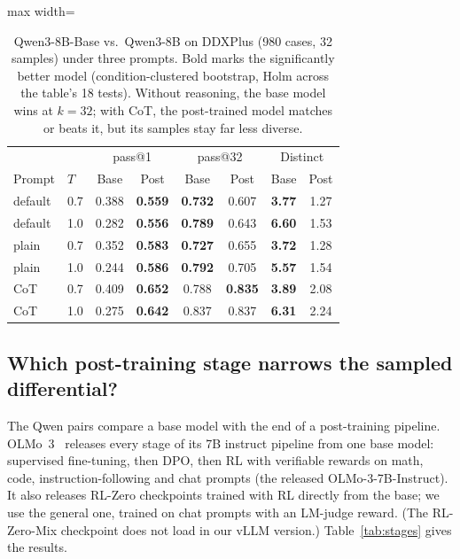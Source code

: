 \documentclass[wcp]{jmlr}
\begin{document}
\begin{table}[t]
\centering\small
\begin{adjustbox}{max width=\linewidth}
\begin{tabular}{llcccccc}
\toprule
 & & \multicolumn{2}{c}{pass@1} & \multicolumn{2}{c}{pass@32} & \multicolumn{2}{c}{Distinct} \\
Prompt & $T$ & Base & Post & Base & Post & Base & Post \\
\midrule
default & 0.7 & 0.388 & \textbf{0.559} & \textbf{0.732} & 0.607 & \textbf{3.77} & 1.27 \\
default & 1.0 & 0.282 & \textbf{0.556} & \textbf{0.789} & 0.643 & \textbf{6.60} & 1.53 \\
plain & 0.7 & 0.352 & \textbf{0.583} & \textbf{0.727} & 0.655 & \textbf{3.72} & 1.28 \\
plain & 1.0 & 0.244 & \textbf{0.586} & \textbf{0.792} & 0.705 & \textbf{5.57} & 1.54 \\
CoT & 0.7 & 0.409 & \textbf{0.652} & 0.788 & \textbf{0.835} & \textbf{3.89} & 2.08 \\
CoT & 1.0 & 0.275 & \textbf{0.642} & 0.837 & 0.837 & \textbf{6.31} & 2.24 \\
\bottomrule
\end{tabular}
\end{adjustbox}
\caption{Qwen3-8B-Base vs.\ Qwen3-8B on DDXPlus (980 cases, 32 samples) under three prompts. Bold marks the significantly better model (condition-clustered bootstrap, Holm across the table's 18 tests). Without reasoning, the base model wins at $k{=}32$; with CoT, the post-trained model matches or beats it, but its samples stay far less diverse.}
\label{tab:prompts}
\end{table}

\subsection{Which post-training stage narrows the sampled differential?}\label{sec:stages}
The Qwen pairs compare a base model with the end of a post-training pipeline. OLMo~3~\citep{olmo2025olmo3} releases every stage of its 7B instruct pipeline from one base model: supervised fine-tuning, then DPO, then RL with verifiable rewards on math, code, instruction-following and chat prompts (the released OLMo-3-7B-Instruct). It also releases RL-Zero checkpoints trained with RL directly from the base; we use the general one, trained on chat prompts with an LM-judge reward. (The RL-Zero-Mix checkpoint does not load in our vLLM version.) Table~\ref{tab:stages} gives the results.
\end{document}
